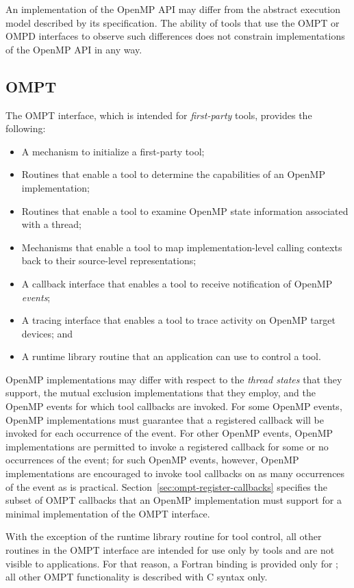 An implementation of the OpenMP API may differ from the
abstract execution model described by its specification.  The ability
of tools that use the OMPT or OMPD interfaces to observe such differences does 
not constrain implementations of the OpenMP API in any way.


\subsection{OMPT}

The OMPT interface, which is intended for \emph{first-party} tools,
provides the following:
\begin{itemize}
\item A mechanism to initialize a first-party tool;
\item Routines that enable a tool to determine the capabilities of an
      OpenMP implementation;
\item Routines that enable a tool to examine OpenMP state information 
      associated with a thread;
\item Mechanisms that enable a tool to map implementation-level calling
      contexts back to their source-level representations;
\item A callback interface that enables a tool to receive notification
      of OpenMP \emph{events};
\item A tracing interface that enables a tool to trace activity on OpenMP 
      target devices; and
\item A runtime library routine that an application can use to control a tool.
\end{itemize}

OpenMP implementations may differ with respect to the \emph{thread states} that
they support, the mutual exclusion implementations that they employ,
and the OpenMP events for which tool callbacks are invoked. For some OpenMP events,
OpenMP implementations must guarantee that a registered callback will be invoked 
for each occurrence of the event. For other OpenMP events, OpenMP implementations 
are permitted to invoke a registered callback for some or no occurrences of the 
event; for such OpenMP events, however, OpenMP implementations are encouraged to 
invoke tool callbacks on as many occurrences of the event as is practical.
Section~\ref{sec:ompt-register-callbacks} specifies the subset of OMPT
callbacks that an OpenMP implementation must support for a minimal
implementation of the OMPT interface.

With the exception of the  runtime library routine for 
tool control, all other routines in the OMPT interface are intended for use 
only by tools and are not visible to applications. For that reason, a Fortran 
binding is provided only for ; all other OMPT functionality 
is described with C syntax only.

